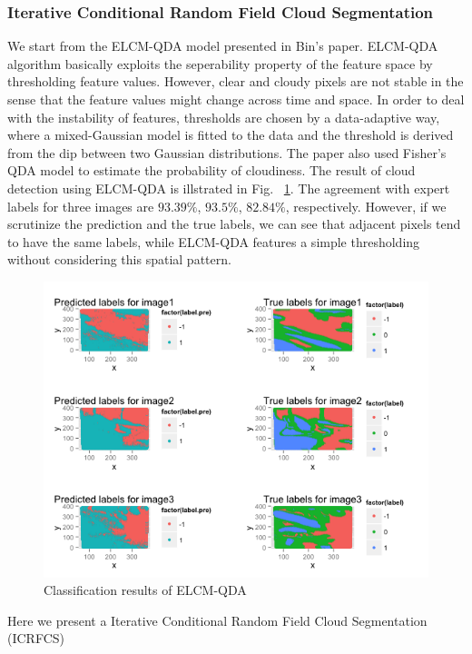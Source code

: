 \documentclass[english]{article}\usepackage{graphicx, color}
\numberwithin{equation}{section}
\numberwithin{figure}{section}
\begin{document}
\subsubsection{Iterative Conditional Random Field Cloud Segmentation}
We start from the ELCM-QDA model presented in Bin's paper. ELCM-QDA algorithm 
basically exploits the seperability property of the feature space by 
thresholding feature values. However, clear and cloudy pixels are not stable 
in the sense that the feature values might change across time and space. In 
order to deal with the instability of features, thresholds are chosen by a 
data-adaptive way, where a mixed-Gaussian model is fitted to the data and 
the threshold is derived from the dip between two Gaussian distributions. 
The paper also used Fisher's QDA model to estimate the probability of cloudiness. 
The result of cloud detection using ELCM-QDA is illstrated in Fig. ~\ref{fig:ELCM}. 
The agreement with expert labels for three images are $93.39\%$, $93.5\%$, 
$82.84\%$, respectively. However, if we scrutinize the prediction and the true 
labels, we can  see that adjacent pixels tend to have the same labels, while 
ELCM-QDA features a simple thresholding without considering this spatial pattern.\\
\begin{figure}[!h]
  \begin{center}
    \includegraphics[width=\columnwidth]{figures/ELCMQDA.png}
  \end{center}
  \caption{Classification results of ELCM-QDA}
  \label{fig:ELCM}
\end{figure}
Here we present a Iterative Conditional Random Field Cloud Segmentation (ICRFCS) 
\end{document}

